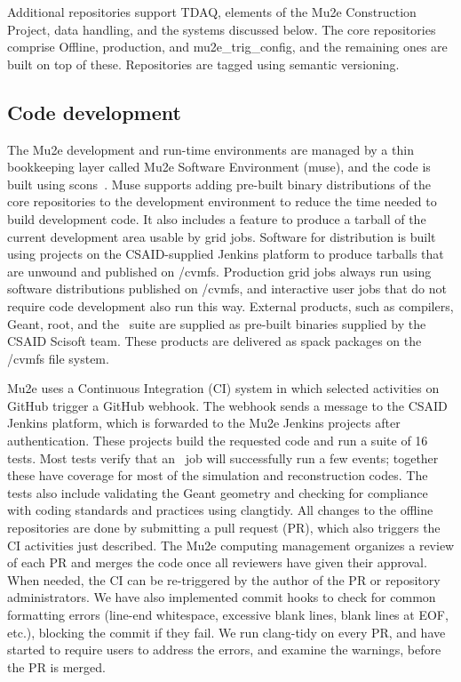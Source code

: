 Additional repositories support TDAQ, elements of the Mu2e Construction Project, data handling, and the systems discussed below. The core repositories comprise Offline, production, and mu2e\_trig\_config, and the remaining ones are built on top of these. Repositories are tagged using semantic versioning. 

\subsection{Code development}

The Mu2e development and run-time environments are managed by a thin bookkeeping layer called Mu2e Software Environment (muse), and the code is built using scons~\cite{scons}. Muse supports adding pre-built binary distributions of the core repositories to the development environment to reduce the time needed to build development code. It also includes a feature to produce a tarball of the current development area usable by grid jobs. Software for distribution is built using projects on the CSAID-supplied Jenkins platform to produce tarballs that are unwound and published on /cvmfs. Production grid jobs always run using software distributions published on /cvmfs, and interactive user jobs that do not require code development also run this way. External products, such as compilers, Geant, root, and the \art\ suite are supplied as pre-built binaries supplied by the CSAID Scisoft team. These products are delivered as spack packages on the /cvmfs file system.

Mu2e uses a Continuous Integration (CI) system in which selected activities on GitHub trigger a GitHub webhook. The webhook sends a message to the CSAID Jenkins platform, which is forwarded to the Mu2e Jenkins projects after authentication. These projects build the requested code and run a suite of 16 tests. Most tests verify that an \art\ job will successfully run a few events; together these have coverage for most of the simulation and reconstruction codes. The tests also include validating the Geant geometry and checking for compliance with coding standards and practices using clangtidy. All changes to the offline repositories are done by submitting a pull request (PR), which also triggers the CI activities just described. The Mu2e computing management organizes a review of each PR and merges the code once all reviewers have given their approval. When needed, the CI can be re-triggered by the author of the PR or repository administrators. We have also implemented commit hooks to check for common formatting errors (line-end whitespace, excessive blank lines, blank lines at EOF, etc.), blocking the commit if they fail. We run clang-tidy on every PR, and have started to require users to address the errors, and examine the warnings, before the PR is merged.


